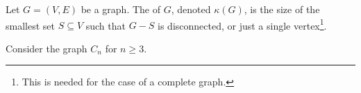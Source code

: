 \documentclass[a4paper]{scrreprt}
\begin{document}
\begin{definition}[Connectivity]
	Let $G = (V, E)$ be a graph. The  of $G$, denoted $\kappa(G)$, is the size of the smallest set $S \subseteq V$ such that $G - S$ is disconnected, or just a single vertex\footnote{This is needed for the case of a complete graph.}.
\end{definition}
\begin{example}[Connectivity of $C_n$]
	Consider the graph $C_n$ for $n \geq 3$.
	\begin{center}
		


\begin{tikzpicture}[x=0.75pt,y=0.75pt,yscale=-1,xscale=1]


\end{tikzpicture}
\end{center}
\end{example}
\end{document}

